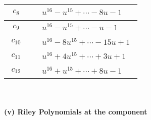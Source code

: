 \documentclass[1p]{elsarticle_modified}
\theoremstyle{definition}
\begin{document}
\begin{tabular}{m{50pt}|m{274pt}}
\hline $$\begin{aligned}c_{8}\end{aligned}$$&$\begin{aligned}
&u^{16}- u^{15}+\cdots-8 u-1
\end{aligned}$\\
\hline $$\begin{aligned}c_{9}\end{aligned}$$&$\begin{aligned}
&u^{16}- u^{15}+\cdots- u-1
\end{aligned}$\\
\hline $$\begin{aligned}c_{10}\end{aligned}$$&$\begin{aligned}
&u^{16}-8 u^{15}+\cdots-15 u+1
\end{aligned}$\\
\hline $$\begin{aligned}c_{11}\end{aligned}$$&$\begin{aligned}
&u^{16}+4 u^{15}+\cdots+3 u+1
\end{aligned}$\\
\hline $$\begin{aligned}c_{12}\end{aligned}$$&$\begin{aligned}
&u^{16}+u^{15}+\cdots+8 u-1
\end{aligned}$\\
\hline
\end{tabular}\\~\\
\newpage\renewcommand{\arraystretch}{1}
\flushleft \textbf{(v) Riley Polynomials at the component}\newline \\
\end{document}

